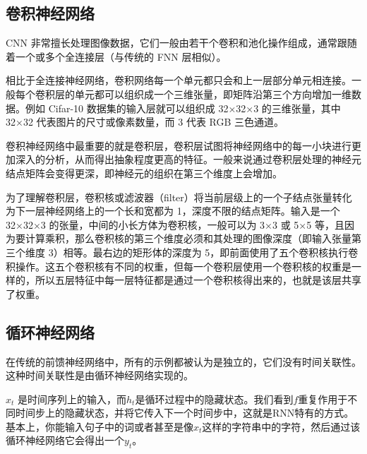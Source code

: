 \documentclass[lang=cn,11pt,a4paper]{elegantpaper}
\begin{document}


\subsection{卷积神经网络}
CNN 非常擅长处理图像数据，它们一般由若干个卷积和池化操作组成，通常跟随着一个或多个全连接层（与传统的 FNN 层相似）。

相比于全连接神经网络，卷积网络每一个单元都只会和上一层部分单元相连接。一般每个卷积层的单元都可以组织成一个三维张量，即矩阵沿第三个方向增加一维数据。例如 Cifar-10 数据集的输入层就可以组织成 32×32×3 的三维张量，其中 32×32 代表图片的尺寸或像素数量，而 3 代表 RGB 三色通道。

卷积神经网络中最重要的就是卷积层，卷积层试图将神经网络中的每一小块进行更加深入的分析，从而得出抽象程度更高的特征。一般来说通过卷积层处理的神经元结点矩阵会变得更深，即神经元的组织在第三个维度上会增加。

为了理解卷积层，卷积核或滤波器（filter）将当前层级上的一个子结点张量转化为下一层神经网络上的一个长和宽都为 1，深度不限的结点矩阵。输入是一个 32×32×3 的张量，中间的小长方体为卷积核，一般可以为 3×3 或 5×5 等，且因为要计算乘积，那么卷积核的第三个维度必须和其处理的图像深度（即输入张量第三个维度 3）相等。最右边的矩形体的深度为 5，即前面使用了五个卷积核执行卷积操作。这五个卷积核有不同的权重，但每一个卷积层使用一个卷积核的权重是一样的，所以五层特征中每一层特征都是通过一个卷积核得出来的，也就是该层共享了权重。

\subsection{循环神经网络}
在传统的前馈神经网络中，所有的示例都被认为是独立的，它们没有时间关联性。这种时间关联性是由循环神经网络实现的。

$x_t$ 是时间序列上的输入，而$h_t$是循环过程中的隐藏状态。我们看到$f$重复作用于不同时间步上的隐藏状态，并将它传入下一个时间步中，这就是RNN特有的方式。基本上，你能输入句子中的词或者甚至是像$x_t$这样的字符串中的字符，然后通过该循环神经网络它会得出一个$y_t$。
\end{document}
